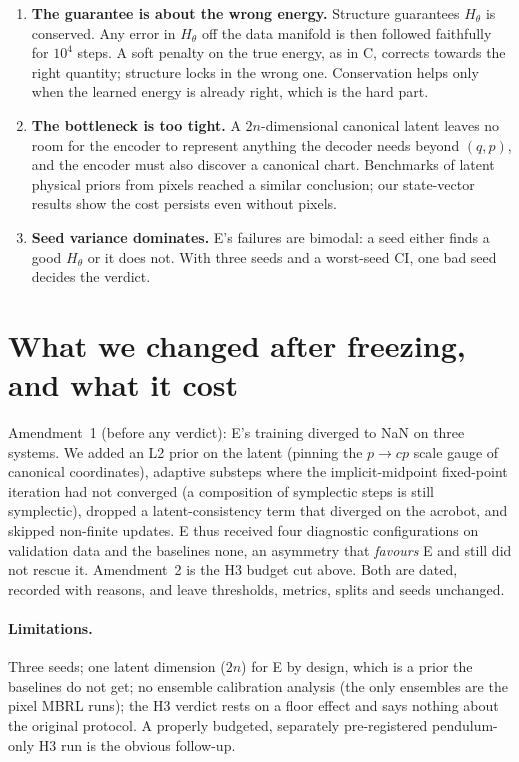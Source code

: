 \documentclass[10pt]{article}
\newcommand{\E}{\textsc{E}}
\begin{document}
\begin{enumerate}
\item \textbf{The guarantee is about the wrong energy.} Structure guarantees $H_\theta$ is conserved.
Any error in $H_\theta$ off the data manifold is then followed faithfully for $10^4$ steps. A soft
penalty on the true energy, as in C, corrects towards the right quantity; structure locks in the wrong
one. Conservation helps only when the learned energy is already right, which is the hard part.
\item \textbf{The bottleneck is too tight.} A $2n$-dimensional canonical latent leaves no room for the
encoder to represent anything the decoder needs beyond $(q,p)$, and the encoder must also discover a
canonical chart. Benchmarks of latent physical priors from pixels \citep{botev2021priors} reached a similar
conclusion; our state-vector results show the cost persists even without pixels.
\item \textbf{Seed variance dominates.} \E's failures are bimodal: a seed either finds a good $H_\theta$
or it does not. With three seeds and a worst-seed CI, one bad seed decides the verdict.
\end{enumerate}

\section{What we changed after freezing, and what it cost}

Amendment~1 (before any verdict): \E's training diverged to NaN on three systems. We added an L2 prior on
the latent (pinning the $p\to cp$ scale gauge of canonical coordinates), adaptive substeps where the
implicit-midpoint fixed-point iteration had not converged (a composition of symplectic steps is still
symplectic), dropped a latent-consistency term that diverged on the acrobot, and skipped non-finite
updates. \E{} thus received four diagnostic configurations on validation data and the baselines none,
an asymmetry that \emph{favours} \E{} and still did not rescue it. Amendment~2 is the H3 budget cut
above. Both are dated, recorded with reasons, and leave thresholds, metrics, splits and seeds unchanged.

\paragraph{Limitations.} Three seeds; one latent dimension ($2n$) for \E{} by design, which is a prior
the baselines do not get; no ensemble calibration analysis (the only ensembles are the pixel MBRL runs);
the H3 verdict rests on a floor effect and says nothing about the original protocol. A properly budgeted,
separately pre-registered pendulum-only H3 run is the obvious follow-up.
\end{document}
